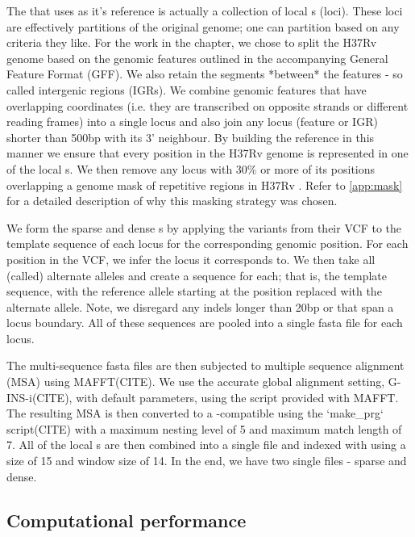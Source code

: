 The \prg{} that \pandora{} uses as it's reference is actually a collection of local \prg{}s (loci). These loci are effectively partitions of the original genome; one can partition based on any criteria they like. For the work in the chapter, we chose to split the H37Rv genome based on the genomic features outlined in the accompanying General Feature Format (GFF). We also retain the segments *between* the features - so called intergenic regions (IGRs). We combine genomic features that have overlapping coordinates (i.e. they are transcribed on opposite strands or different reading frames) into a single locus and also join any locus (feature or IGR) shorter than 500bp with its 3' neighbour. By building the reference \prg{} in this manner we ensure that every position in the H37Rv genome is represented in one of the local \prg{}s. We then remove any locus with 30\% or more of its positions overlapping a genome mask of repetitive regions in H37Rv \cite{tbmask2014}. Refer to \autoref{app:mask} for a detailed description of why this masking strategy was chosen.

We form the sparse and dense \prg{}s by applying the variants from their VCF to the template sequence of each locus for the corresponding genomic position. For each position in the VCF, we infer the locus it corresponds to. We then take all (called) alternate alleles and create a sequence for each; that is, the template sequence, with the reference allele starting at the position replaced with the alternate allele. Note, we disregard any indels longer than 20bp or that span a locus boundary. All of these sequences are pooled into a single fasta file for each locus. 

The multi-sequence fasta files are then subjected to multiple sequence alignment (MSA) using MAFFT(CITE). We use the accurate global alignment setting, G-INS-i(CITE), with default parameters, using the  script provided with MAFFT. The resulting MSA is then converted to a \pandora{}-compatible \prg{} using the `make\_prg` script(CITE) with a maximum nesting level of 5 and maximum match length of 7. All of the local \prg{}s are then combined into a single \prg{} file and indexed with \pandora{} using a \kmer{} size of 15 and window size of 14. In the end, we have two single \prg{} files - sparse and dense.

\subsection{Computational performance}

